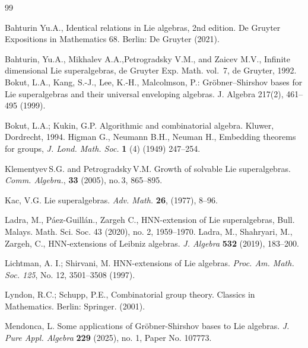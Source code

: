 \documentclass[12pt, reqno]{amsart}
\theoremstyle{remark}
\theoremstyle{definition}
\numberwithin{equation}{section}
\begin{document}
\begin{thebibliography}{99}

   Bahturin Yu.A.,
   {Identical relations in Lie algebras}, %
   2nd edition. De Gruyter Expositions in Mathematics 68. Berlin: De Gruyter (2021).   

    Bahturin, Yu.A., Mikhalev A.A.,Petrogradsky  V.M., and Zaicev M.V.,
    Infinite dimensional Lie superalgebras,
    {de Gruyter Exp. Math.} vol.~{7},
    de Gruyter, 1992.
 Bokut, L.A., Kang, S.-J., Lee, K.-H., Malcolmson, P.: Gröbner–Shirshov bases for Lie superalgebras
and their universal enveloping algebras. J. Algebra 217(2), 461–495 (1999).


   Bokut, L.A.; Kukin, G.P.
   Algorithmic and combinatorial algebra.
   Kluwer, Dordrecht, 1994.
  Higman G., Neumann B.H., Neuman H., Embedding theorems for groups, {\it J. Lond. Math. Soc.} {\bf 1} (4) (1949) 247--254.


   Klementyev\,S.G. and Petrogradsky\,V.M.
   Growth of solvable Lie superalgebras.
   {\it Comm. Algebra.}, {\bf 33} (2005), no.\,3, 865--895.

   Kac, V.G.
   Lie superalgebras.
   {\it Adv. Math.} {\bf 26}, (1977), 8--96.

   
Ladra, M., Páez-Guillán., Zargeh C., HNN-extension of Lie superalgebras,
Bull. Malays. Math. Sci. Soc. 43 (2020), no. 2, 1959--1970.
Ladra, M., Shahryari, M., Zargeh, C.,
HNN-extensions of Leibniz algebras.
{\it J. Algebra} {\bf 532} (2019), 183--200.

 Lichtman, A. I.; Shirvani, M. HNN-extensions of Lie algebras. 
 {\it Proc. Am. Math. Soc. 125}, No. 12, 3501--3508 (1997).


  Lyndon, R.C.; Schupp, P.E.,
Combinatorial group theory. 
Classics in Mathematics. Berlin: Springer. (2001). 

   Mendonca, L.
   Some applications of Gr\"obner-Shirshov bases to Lie algebras.
   {\it J. Pure Appl. Algebra} {\bf 229} (2025), no. 1, Paper No. 107773.



\end{thebibliography}
\end{document}
